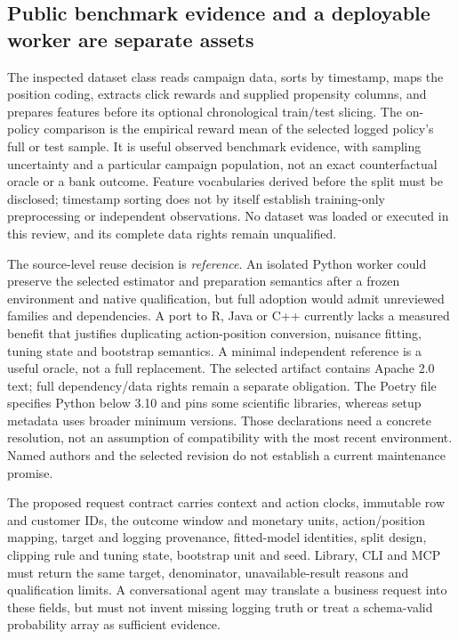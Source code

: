 \subsection{Public benchmark evidence and a deployable worker are separate assets}
\label{exec23:obp-decision}
The inspected dataset class reads campaign data, sorts by timestamp, maps the
position coding, extracts click rewards and supplied propensity columns, and
prepares features before its optional chronological train/test slicing. The
on-policy comparison is the empirical reward mean of the selected logged
policy's full or test sample. It is useful observed benchmark evidence, with
sampling uncertainty and a particular campaign population, not an exact
counterfactual oracle or a bank outcome. Feature vocabularies derived before
the split must be disclosed; timestamp sorting does not by itself establish
training-only preprocessing or independent observations. No dataset was loaded
or executed in this review, and its complete data rights remain unqualified.
\citep{exec23_obp_sources}

The source-level reuse decision is \emph{reference}. An isolated Python worker
could preserve the selected estimator and preparation semantics after a frozen
environment and native qualification, but full adoption would admit unreviewed
families and dependencies. A port to R, Java or C++ currently lacks a measured
benefit that justifies duplicating action-position conversion, nuisance fitting,
tuning state and bootstrap semantics. A minimal independent reference is a
useful oracle, not a full replacement. The selected artifact contains Apache
2.0 text; full dependency/data rights remain a separate obligation. The
Poetry file specifies Python below 3.10 and pins some scientific libraries,
whereas setup metadata uses broader minimum versions. Those declarations need
a concrete resolution, not an assumption of compatibility with the most recent
environment. Named authors and the selected revision do not establish a current
maintenance promise. \citep{exec23_obp_sources}

The proposed request contract carries context and action clocks, immutable row
and customer IDs, the outcome window and monetary units, action/position
mapping, target and logging provenance, fitted-model identities, split design,
clipping rule and tuning state, bootstrap unit and seed. Library, CLI and MCP
must return the same target, denominator, unavailable-result reasons and
qualification limits. A conversational agent may translate a business request
into these fields, but must not invent missing logging truth or treat a
schema-valid probability array as sufficient evidence.


